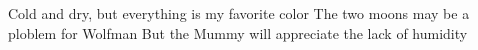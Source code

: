 Cold and dry, but everything is my favorite color
The two moons may be a ploblem for Wolfman
But the Mummy will appreciate the lack of humidity

